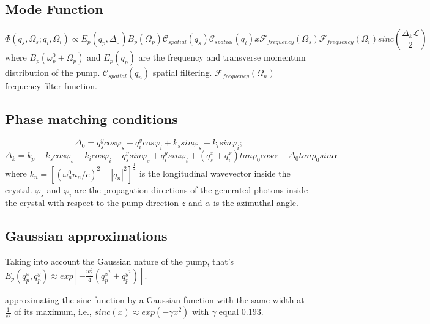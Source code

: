 
\subsection{Mode Function}
\begin{equation}
\Phi(q_s,\Omega_s;q_i,\Omega_i) \propto E_p(q_p,\Delta_0) B_p(\Omega_p) \mathcal{C}_{spatial}(q_s) \mathcal{C}_{spatial}(q_i) 
 x \mathcal{F}_{frequency}(\Omega_s) \mathcal{F}_{frequency}(\Omega_i) sinc \left( \frac{\Delta_k \mathcal{L}}{2} \right)
\end{equation}
where $B_p(\omega^0_p+\Omega_p)$ and $E_p(q_p)$ are the frequency and transverse momentum distribution of the pump. $\mathcal{C}_{spatial}(q_n)$ spatial filtering. $\mathcal{F}_{frequency}(\Omega_n)$ frequency filter function.

\subsection{Phase matching conditions}
\begin{equation}
\Delta_0 = q^y_s cos \varphi_s + q^y_i cos \varphi_i + k_s sin \varphi_s - k_i sin \varphi_i ;
\end{equation}
\begin{equation}
\Delta_k = k_p - k_s cos \varphi_s - k_i cos \varphi_i - q^y_s sin \varphi_s + q^y_i sin \varphi_i 
+ (q^x_s + q^x_i ) tan \rho_0 cos \alpha + \Delta_0 tan \rho_0 sin \alpha 
\end{equation}
where $k_n=[(\omega^0_n n_n / c )^2 - |q_n|^2]^{\frac{1}{2}}$ is the longitudinal wavevector inside the crystal. $\varphi_s$ and $\varphi_i$ are the propagation directions of the generated photons inside the crystal with respect to the pump direction $z$ and $\alpha$ is the azimuthal angle.

\subsection{Gaussian approximations}

Taking into account the Gaussian nature of the pump, that's $E_p(q^x_p , q^y_p ) \approx exp \left[ -\frac{w_p^2}{4}(q^{x^2}_p + q^{y^2}_p )\right]$.

approximating the sinc function by a Gaussian function with the same width at $\frac{1}{e^2}$ of its maximum, i.e., $sinc(x)\approx exp(- \gamma x^2)$  with $\gamma$ equal 0.193. 

